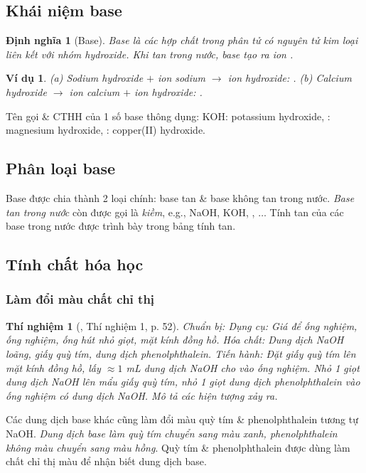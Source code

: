 \documentclass{article}
\newtheorem{dinhnghia}{Định nghĩa}
\newtheorem{thinghiem}{Thí nghiệm}
\newtheorem{vidu}{Ví dụ}
\begin{document}
\subsection{Khái niệm base}

\begin{dinhnghia}[Base]
	{\rm Base} là các hợp chất trong phân tử có nguyên tử kim loại liên kết với nhóm hydroxide. Khi tan trong nước, base tạo ra ion {\rm{}}.
\end{dinhnghia}

\begin{vidu}
	(a) Sodium hydroxide $+$ ion sodium $\to$ ion hydroxide: {\rm{}}. (b) Calcium hydroxide $\to$ ion calcium $+$ ion hydroxide: {\rm{}}.
\end{vidu}
Tên gọi \& CTHH của 1 số base thông dụng: KOH: potassium hydroxide, : magnesium hydroxide, : copper(II) hydroxide.

\subsection{Phân loại base}
Base được chia thành 2 loại chính: base tan \& base không tan trong nước. \textit{Base tan trong nước} còn được gọi là \textit{kiềm}, e.g., NaOH, KOH, , $\ldots$ Tính tan của các base trong nước được trình bày trong bảng tính tan.

\subsection{Tính chất hóa học}

\subsubsection{Làm đổi màu chất chỉ thị}

\begin{thinghiem}[\cite{SGK_KHTN_8_Canh_Dieu}, Thí nghiệm 1, p. 52]
	{\rm Chuẩn bị:} Dụng cụ: Giá để ống nghiệm, ống nghiệm, ống hút nhỏ giọt, mặt kính đồng hồ. Hóa chất: Dung dịch {\rm NaOH} loãng, giấy quỳ tím, dung dịch phenolphthalein. {\rm Tiến hành:} Đặt giấy quỳ tím lên mặt kính đồng hồ, lấy $\approx1$ {\rm mL} dung dịch {\rm NaOH} cho vào ống nghiệm. Nhỏ 1 giọt dung dịch {\rm NaOH} lên mẩu giấy quỳ tím, nhỏ 1 giọt dung dịch phenolphthalein vào ống nghiệm có dung dịch {\rm NaOH}. Mô tả các hiện tượng xảy ra.
\end{thinghiem}
Các dung dịch base khác cũng làm đổi màu quỳ tím \& phenolphthalein tương tự NaOH. \textit{Dung dịch base làm quỳ tím chuyển sang màu xanh, phenolphthalein không màu chuyển sang màu hồng}. Quỳ tím \& phenolphthalein được dùng làm chất chỉ thị màu để nhận biết dung dịch base.
\end{document}
